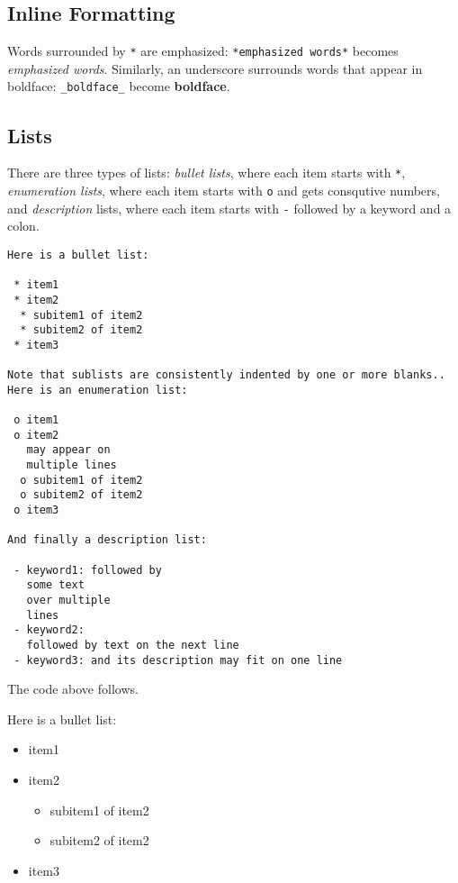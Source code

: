 \documentclass[twoside]{article}
\begin{document}
\subsection{Inline Formatting}

Words surrounded by {\fontsize{10pt}{10pt}\verb!*!} are emphasized: {\fontsize{10pt}{10pt}\verb!*emphasized words*!} becomes
\emph{emphasized words}. Similarly, an underscore surrounds words that
appear in boldface: {\fontsize{10pt}{10pt}\verb!_boldface_!} become \textbf{boldface}.

\subsection{Lists}

There are three types of lists: \emph{bullet lists}, where each item starts
with {\fontsize{10pt}{10pt}\verb!*!}, \emph{enumeration lists}, where each item starts with {\fontsize{10pt}{10pt}\verb!o!} and gets
consqutive numbers,
and \emph{description} lists, where each item starts with {\fontsize{10pt}{10pt}\verb!-!} followed
by a keyword and a colon.
\begin{Verbatim}
Here is a bullet list:

 * item1
 * item2
  * subitem1 of item2
  * subitem2 of item2
 * item3

Note that sublists are consistently indented by one or more blanks..
Here is an enumeration list:

 o item1
 o item2
   may appear on
   multiple lines
  o subitem1 of item2
  o subitem2 of item2
 o item3

And finally a description list:

 - keyword1: followed by
   some text
   over multiple
   lines
 - keyword2:
   followed by text on the next line
 - keyword3: and its description may fit on one line
\end{Verbatim}
The code above follows.

Here is a bullet list:

\begin{itemize}
 \item item1

 \item item2
\begin{itemize}

  \item subitem1 of item2

  \item subitem2 of item2

\end{itemize}

\noindent
 \item item3
\end{itemize}
\end{document}
